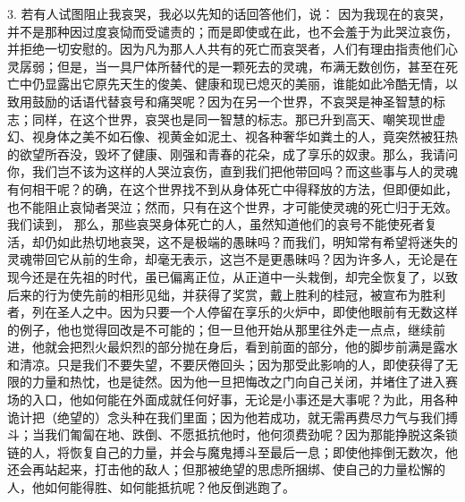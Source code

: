 3. 若有人试图阻止我哀哭，我必以先知的话回答他们，说：  因为我现在的哀哭，并不是那种因过度哀恸而受谴责的；而是即使或在此，也不会羞于为此哭泣哀伤，并拒绝一切安慰的。因为凡为那人人共有的死亡而哀哭者，人们有理由指责他们心灵孱弱；但是，当一具尸体所替代的是一颗死去的灵魂，布满无数创伤，甚至在死亡中仍显露出它原先天生的俊美、健康和现已熄灭的美丽，谁能如此冷酷无情，以致用鼓励的话语代替哀号和痛哭呢？因为在另一个世界，不哀哭是神圣智慧的标志；同样，在这个世界，哀哭也是同一智慧的标志。那已升到高天、嘲笑现世虚幻、视身体之美不如石像、视黄金如泥土、视各种奢华如粪土的人，竟突然被狂热的欲望所吞没，毁坏了健康、刚强和青春的花朵，成了享乐的奴隶。那么，我请问你，我们岂不该为这样的人哭泣哀伤，直到我们把他带回吗？而这些事与人的灵魂有何相干呢？的确，在这个世界找不到从身体死亡中得释放的方法，但即便如此，也不能阻止哀恸者哭泣；然而，只有在这个世界，才可能使灵魂的死亡归于无效。我们读到， 那么，那些哀哭身体死亡的人，虽然知道他们的哀号不能使死者复活，却仍如此热切地哀哭，这不是极端的愚昧吗？而我们，明知常有希望将迷失的灵魂带回它从前的生命，却毫无表示，这岂不是更愚昧吗？因为许多人，无论是在现今还是在先祖的时代，虽已偏离正位，从正道中一头栽倒，却完全恢复了，以致后来的行为使先前的相形见绌，并获得了奖赏，戴上胜利的桂冠，被宣布为胜利者，列在圣人之中。因为只要一个人停留在享乐的火炉中，即使他眼前有无数这样的例子，他也觉得回改是不可能的；但一旦他开始从那里往外走一点点，继续前进，他就会把烈火最炽烈的部分抛在身后，看到前面的部分，他的脚步前满是露水和清凉。只是我们不要失望，不要厌倦回头；因为那受此影响的人，即使获得了无限的力量和热忱，也是徒然。因为他一旦把悔改之门向自己关闭，并堵住了进入赛场的入口，他如何能在外面成就任何好事，无论是小事还是大事呢？为此，用各种诡计把（绝望的）念头种在我们里面；因为他若成功，就无需再费尽力气与我们搏斗；当我们匍匐在地、跌倒、不愿抵抗他时，他何须费劲呢？因为那能挣脱这条锁链的人，将恢复自己的力量，并会与魔鬼搏斗至最后一息；即使他摔倒无数次，他还会再站起来，打击他的敌人；但那被绝望的思虑所捆绑、使自己的力量松懈的人，他如何能得胜、如何能抵抗呢？他反倒逃跑了。\par

